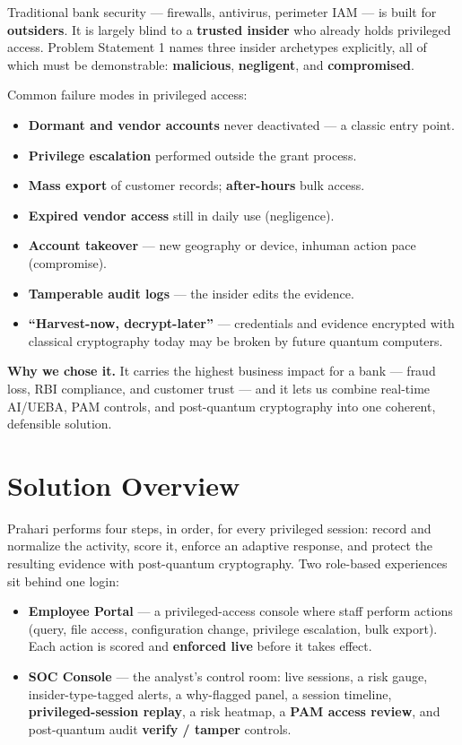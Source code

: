 \documentclass[
]{article}
\providecommand{\tightlist}{%
  \setlength{\itemsep}{0pt}\setlength{\parskip}{0pt}}
\begin{document}
Traditional bank security --- firewalls, antivirus, perimeter IAM --- is
built for \textbf{outsiders}. It is largely blind to a \textbf{trusted
insider} who already holds privileged access. Problem Statement 1 names
three insider archetypes explicitly, all of which must be demonstrable:
\textbf{malicious}, \textbf{negligent}, and \textbf{compromised}.

Common failure modes in privileged access:

\begin{itemize}
\tightlist
\item
  \textbf{Dormant and vendor accounts} never deactivated --- a classic
  entry point.
\item
  \textbf{Privilege escalation} performed outside the grant process.
\item
  \textbf{Mass export} of customer records; \textbf{after-hours} bulk
  access.
\item
  \textbf{Expired vendor access} still in daily use (negligence).
\item
  \textbf{Account takeover} --- new geography or device, inhuman action
  pace (compromise).
\item
  \textbf{Tamperable audit logs} --- the insider edits the evidence.
\item
  \textbf{``Harvest-now, decrypt-later''} --- credentials and evidence
  encrypted with classical cryptography today may be broken by future
  quantum computers.
\end{itemize}

\textbf{Why we chose it.} It carries the highest business impact for a
bank --- fraud loss, RBI compliance, and customer trust --- and it lets
us combine real-time AI/UEBA, PAM controls, and post-quantum
cryptography into one coherent, defensible solution.

\section{Solution Overview}\label{solution-overview}

Prahari performs four steps, in order, for every privileged session:
record and normalize the activity, score it, enforce an adaptive
response, and protect the resulting evidence with post-quantum
cryptography. Two role-based experiences sit behind one login:

\begin{itemize}
\tightlist
\item
  \textbf{Employee Portal} --- a privileged-access console where staff
  perform actions (query, file access, configuration change, privilege
  escalation, bulk export). Each action is scored and \textbf{enforced
  live} before it takes effect.
\item
  \textbf{SOC Console} --- the analyst's control room: live sessions, a
  risk gauge, insider-type-tagged alerts, a why-flagged panel, a session
  timeline, \textbf{privileged-session replay}, a risk heatmap, a
  \textbf{PAM access review}, and post-quantum audit \textbf{verify /
  tamper} controls.
\end{itemize}
\end{document}

